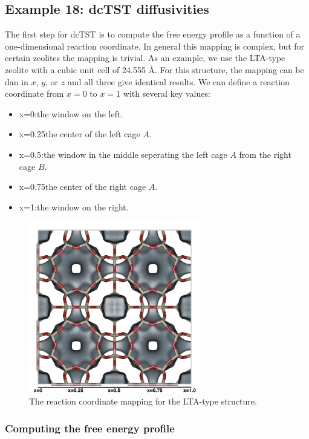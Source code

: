\subsection*{Example 18: dcTST diffusivities}

The first step for dcTST is to compute the free energy profile as a function of a one-dimensional reaction coordinate.
In general this mapping is complex, but for certain zeolites the mapping is trivial.
As an example, we use the LTA-type zeolite with a cubic unit cell of 24.555 \AA.
For this structure, the mapping can be dan in $x$, $y$, or $z$ and all three give identical results.
We can define a reaction coordinate from $x=0$ to $x=1$ with several key values:
\begin{itemize}
 \item{x=0}:\quad the window on the left.
 \item{x=0.25}\quad the center of the left cage $A$.
 \item{x=0.5}:\quad the window in the middle seperating the left cage $A$ from the right cage $B$.
 \item{x=0.75}\quad the center of the right cage $A$.
 \item{x=1}:\quad the window on the right.
\end{itemize}

\begin{figure}[t]
  \centering
  \includegraphics[width=7.5cm]{./Examples/Figures/LTA_dcTST.png}
  \caption{The reaction coordinate mapping for the LTA-type structure.}
  \label{Fig: LTA dcTST}
\end{figure}

\subsubsection{Computing the free energy profile}


